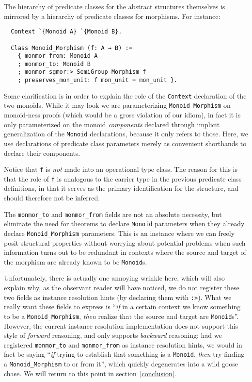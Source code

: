\documentclass[a4paper,10pt,runningheads]{llncs}
\begin{document}
The hierarchy of predicate classes for the abstract structures themselves is mirrored by a hierarchy of predicate classes for morphisms. For instance:
\begin{lstlisting}
  Context `{Monoid A} `{Monoid B}.

  Class Monoid_Morphism (f: A → B) :=
    { monmor_from: Monoid A
    ; monmor_to: Monoid B
    ; monmor_sgmor:> SemiGroup_Morphism f
    ; preserves_mon_unit: f mon_unit = mon_unit }.
\end{lstlisting}

Some clarification is in order to explain the role of the \lstinline|Context| declaration of the two monoids. While it may look we are parameterizing \lstinline|Monoid_Morphism| on monoid-ness proofs (which would be a gross violation of our idiom), in fact it is only parameterized on the monoid \emph{components} declared through implicit generalization of the \lstinline|Monoid| declarations, because it only refers to those. Here, we use declarations of predicate class parameters merely as convenient shorthands to declare their components.

Notice that \lstinline|f| is \emph{not} made into an operational type class. The reason for this is that the role of \lstinline|f| is analogous to the carrier type in the previous predicate class definitions, in that it serves as the primary identification for the structure, and should therefore not be inferred.

The \lstinline|monmor_to| and \lstinline|monmor_from| fields are not an absolute necessity, but eliminate the need for theorems to declare \lstinline|Monoid| parameters when they already declare \lstinline|Monoid_Morphism| parameters. This is an instance where we can freely posit structural properties without worrying about potential problems when such information turns out to be redundant in contexts where the source and target of the morphism are already known to be \lstinline|Monoid|s.

Unfortunately, there is actually one annoying wrinkle here, which will also explain why, as the observant reader will have noticed, we do not register these two fields as instance resolution hints (by declaring them with \lstinline|:>|). What we really want these fields to express is ``\emph{if} in a certain context we know something to be a \lstinline|Monoid_Morphism|, \emph{then} realize that the source and target are \lstinline|Monoid|s''. However, the current instance resolution implementation does not support this style of \emph{forward} reasoning, and only supports \emph{backward} reasoning: had we registered \lstinline|monmor_to| and \lstinline|monmor_from| as instance resolution hints, we would in fact be saying ``\emph{if} trying to establish that something is a \lstinline|Monoid|, \emph{then} try finding a \lstinline|Monoid_Morphism| to or from it'', which quickly degenerates into a wild goose chase. We will return to this point in section~\ref{conclusion}. %
\end{document}
